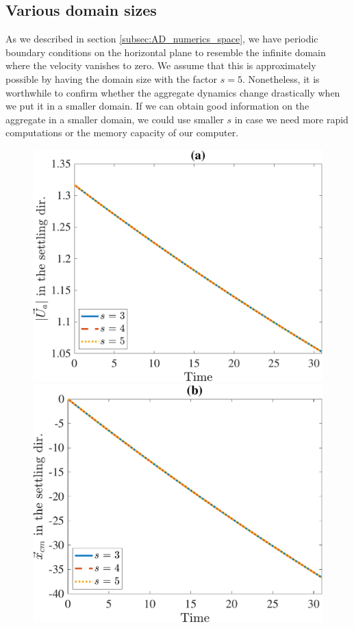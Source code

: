 \subsection{Various domain sizes}
As we described in section \ref{subsec:AD_numerics_space}, we have periodic boundary conditions on the horizontal plane to resemble the infinite domain where the velocity vanishes to zero. 
We assume that this is approximately possible by having the domain size with the factor $s = 5$. Nonetheless, it is worthwhile to confirm whether the aggregate dynamics change drastically when we put it in a smaller domain. If we can obtain good information on the aggregate in a smaller domain, we could use smaller $s$ in case we need more rapid computations or the memory capacity of our computer. 
\begin{figure}[ht]
	\begin{center}
		\includegraphics[scale=0.2]{./figures/fig_NC10_s_Ua3_all}
		\includegraphics[scale=0.2]{./figures/fig_NC10_s_cm3_all}

\end{center}
\end{figure}
